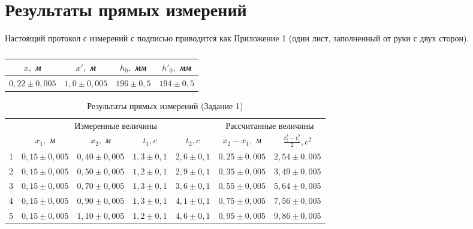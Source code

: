 \documentclass[11pt]{article}
\begin{document}
\section{Результаты прямых измерений}
Настоящий протокол с измерений с подписью приводится как Приложение 1 (один лист, заполненный от руки с двух сторон).
\begin{table}[htb]
\centering
\large
\caption{}
\begin{tabular}{|c|c|c|c|}
		\hline
		$x,$ \textit{м} & $x',$ \textit{м} & $h_0,$ \textit{мм}  & $h'_0,$ \textit{мм}\\
		\hline
		$0,22 \pm 0,005$& $1,0 \pm 0,005$& $196\pm 0,5$ &$ 194 \pm 0,5$\\
		\hline
	\end{tabular}
\end{table}
\begin{table}[htb]
	\caption{Результаты прямых измерений (Задание 1)}
	\centering
	\large
	\begin{tabular}{|c|c|c|c|c|c|c|}
		\hline
		\multirow{2}{*}{\textnumero} & \multicolumn{4}{c}{Измеренные величины} & \multicolumn{2}{|c|}{Рассчитанные величины}\\
		\cline{2-7}
						      & $x_1,$ \textit{м}  & $x_2,$ \textit{м}  & $t_1, c$  & $t_2, c$   & $x_2 - x_1, $ \textit{м} & $\frac{t^2_{2} - t^2_1}{2}, c^2$\\
		\hline
		1 & $0,15 \pm 0,005$ & $0,40 \pm 0,005$ & $1,3 \pm 0,1$ & $2,6 \pm 0,1$ & $0,25 \pm 0,005$ & $2,54  \pm 0,005$\\
		\hline
		2 & $0,15 \pm 0,005$ & $0,50 \pm 0,005$ & $1,2 \pm 0,1$ & $2,9 \pm 0,1$ & $0,35 \pm 0,005$ & $3,49  \pm 0,005$\\
		\hline
		3 &$0,15 \pm 0,005$ & $0,70 \pm 0,005$ & $1,3 \pm 0,1$& $3,6 \pm 0,1$ & $0,55 \pm 0,005$ & $5,64  \pm 0,005$\\
		\hline
		4 & $0,15 \pm 0,005$ & $0,90 \pm 0,005$ & $1,3 \pm 0,1$& $4,1 \pm 0,1$ & $0,75 \pm 0,005$ & $7,56  \pm0,005$\\
		\hline
		5 & $0,15 \pm 0,005$ & $1,10 \pm 0,005$ & $1,2 \pm 0,1$& $4,6 \pm 0,1$ &$0,95 \pm 0,005$  & $9,86  \pm 0,005$\\
		\hline
	\end{tabular}
\end{table}
\end{document}
